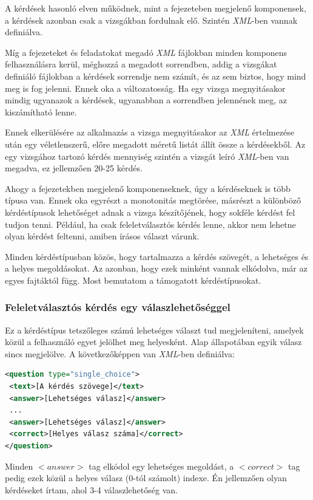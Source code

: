 \documentclass[12pt,a4paper]{article}
\newcommand{\xml}{\textit{XML}\xspace}
\begin{document}
	A kérdések hasonló elven működnek, mint a fejezeteben megjelenő komponensek, a kérdések azonban csak a vizsgákban fordulnak elő. Szintén \xml-ben vannak definiálva.
	
	Míg a fejezeteket és feladatokat megadó \xml fájlokban minden komponens felhasználásra kerül, méghozzá a megadott sorrendben, addig a vizsgákat definiáló fájlokban a kérdések sorrendje nem számít, és az sem biztos, hogy mind meg is fog jelenni. Ennek oka a változatosság. Ha egy vizsga megnyitásakor mindig ugyanazok a kérdések, ugyanabban a sorrendben jelennének meg, az kiszámítható lenne.
	
	Ennek elkerülésére az alkalmazás a vizsga megnyitásakor az \xml értelmezése után egy véletlenszerű, előre megadott méretű listát állít össze a kérdésekből. Az egy vizsgához tartozó kérdés mennyiség szintén a vizsgát leíró \xml-ben van megadva, ez jellemzően 20-25 kérdés.
	
	Ahogy a fejezetekben megjelenő komponenseknek, úgy a kérdéseknek is több típusa van. Ennek oka egyrészt a monotonitás megtörése, másrészt a különböző kérdéstípusok lehetőséget adnak a vizsga készítőjének, hogy sokféle kérdést fel tudjon tenni. Például, ha csak feleletválasztós kérdés lenne, akkor nem lehetne olyan kérdést feltenni, amiben írásos választ várunk.
	
	Minden kérdéstípusban közös, hogy tartalmazza a kérdés szövegét, a lehetséges és a helyes megoldásokat. Az azonban, hogy ezek minként vannak elkódolva, már az egyes fajtáktól függ. Most bemutatom a támogatott kérdéstípusokat.
	
	\subsubsection{Feleletválasztós kérdés egy válaszlehetőséggel}
	
	Ez a kérdéstípus tetszőleges számú lehetséges választ tud megjeleníteni, amelyek közül a felhasználó egyet jelölhet meg helyesként. Alap állapotában egyik válasz sincs megjelölve. A következőképpen van \xml-ben definiálva:
	
		\bigskip
	\begin{lstlisting}[language=XML]
<question type="single_choice">
 <text>[A kérdés szövege]</text>
 <answer>[Lehetséges válasz]</answer>
 ...
 <answer>[Lehetséges válasz]</answer>
 <correct>[Helyes válasz száma]</correct>
</question>
	\end{lstlisting}
	\bigskip
	
	Minden $<answer>$ tag elkódol egy lehetséges megoldást, a $<correct>$ tag pedig ezek közül a helyes válasz (0-tól számolt) indexe. Én jellemzően olyan kérdéseket írtam, ahol 3-4 válaszlehetőség van. 
	
\end{document}
